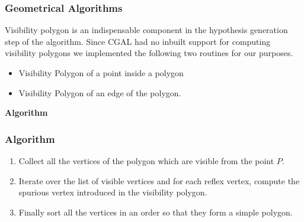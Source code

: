 \documentclass{beamer}
\begin{document}
\frame
{
  \frametitle{Geometrical Algorithms}

Visibility polygon is an indispensable component in the hypothesis generation step of the algorithm. Since CGAL had no inbuilt support
 for computing visibility polygons we implemented the following two routines for our purposes.
\begin{itemize}
 \item Visibility Polygon of a point inside a polygon
 \item Visibility Polygon of an edge of the polygon.
\end{itemize}

}


\frame
{

{\bf Algorithm}
\frametitle{Algorithm}

\begin{enumerate}
 \item 
Collect all the vertices of the polygon which are visible from the point $P$.
\item
Iterate over the list of visible vertices and for each reflex vertex, compute the spurious vertex introduced in the visibility polygon.
\item
Finally sort all the vertices in an order so that they form a simple polygon.
\end{enumerate}

}
\end{document}
